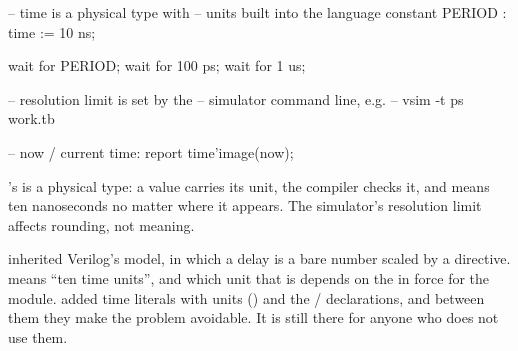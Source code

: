 \begin{rosetta}
\begin{rleft}
-- time is a physical type with
-- units built into the language
constant PERIOD : time := 10 ns;

wait for PERIOD;
wait for 100 ps;
wait for 1 us;

-- resolution limit is set by the
-- simulator command line, e.g.
--   vsim -t ps work.tb

-- now / current time:
report time'image(now);
\end{rleft}
\end{rosetta}


\VHDL{}'s  is a physical type: a value carries its unit, the
compiler checks it, and  means ten nanoseconds no matter where it
appears. The simulator's resolution limit affects rounding, not meaning.

\SV{} inherited Verilog's model, in which a delay is a bare number scaled by a
directive.  means ``ten time units'', and which unit that is depends on
the  in force for the module. \SV{} added time literals
with units () and the / declarations,
and between them they make the problem avoidable. It is still there for anyone
who does not use them.

